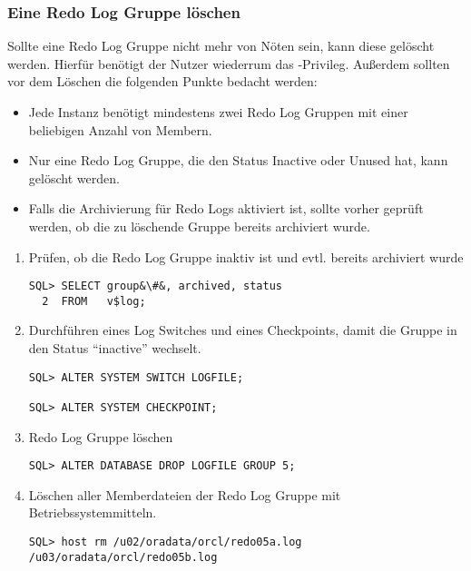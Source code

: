         \subsubsection{Eine Redo Log Gruppe löschen}
          Sollte eine Redo Log Gruppe nicht mehr von Nöten sein, kann diese gelöscht werden. Hierfür benötigt der Nutzer wiederrum das -Privileg. Außerdem sollten vor dem Löschen die folgenden Punkte bedacht werden:
          \begin{itemize}
            \item Jede Instanz benötigt mindestens zwei Redo Log Gruppen mit einer beliebigen Anzahl von Membern.
            \item Nur eine Redo Log Gruppe, die den Status Inactive oder Unused hat, kann gelöscht werden.
            \item Falls die Archivierung für Redo Logs aktiviert ist, sollte vorher geprüft werden, ob die zu löschende Gruppe bereits archiviert wurde.
          \end{itemize}
            \begin{enumerate}
              \item Prüfen, ob die Redo Log Gruppe inaktiv ist und evtl. bereits archiviert wurde
                \begin{lstlisting}[caption={Status der Redo Logs prüfen},label=admin40,language=oracle_sql]
SQL> SELECT group&\#&, archived, status
  2  FROM   v$log;
                \end{lstlisting}
              \item Durchführen eines Log Switches und eines Checkpoints, damit die Gruppe in den Status \enquote{inactive} wechselt.
                \begin{lstlisting}[caption={Log Switch + Checkpoint durchführen},label=admin41,language=oracle_sql]
SQL> ALTER SYSTEM SWITCH LOGFILE;

SQL> ALTER SYSTEM CHECKPOINT;
                \end{lstlisting}
              \item Redo Log Gruppe löschen
              \begin{lstlisting}[caption={Log Gruppe löschen},label=admin42,language=oracle_sql]
SQL> ALTER DATABASE DROP LOGFILE GROUP 5;
                \end{lstlisting}
              \item Löschen aller Memberdateien der Redo Log Gruppe mit Betriebssystemmitteln.
              \begin{lstlisting}[caption={Log Gruppe löschen},label=admin42a,language=sqlplus]
SQL> host rm /u02/oradata/orcl/redo05a.log /u03/oradata/orcl/redo05b.log
                \end{lstlisting}
            \end{enumerate}
